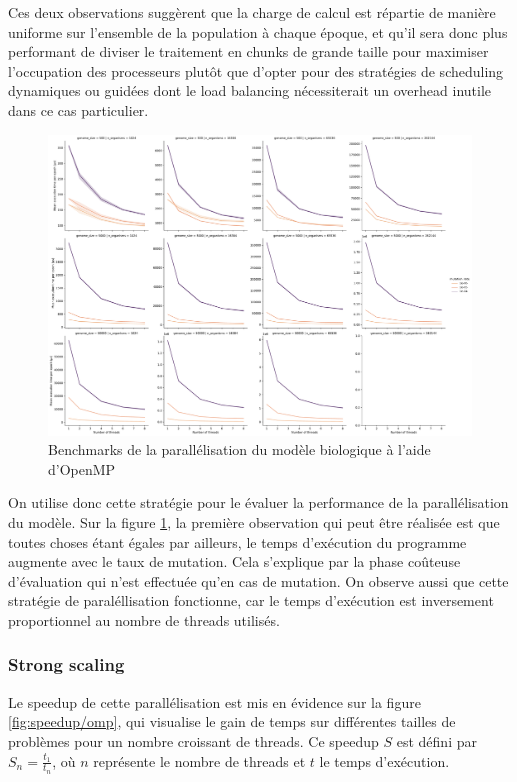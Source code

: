\documentclass[a4paper, 10pt, twoside]{article}
\begin{document}
Ces deux observations suggèrent que la charge de calcul est répartie de manière uniforme sur l'ensemble de la population à chaque époque, et qu'il sera donc plus performant de diviser le traitement en chunks de grande taille pour maximiser l'occupation des processeurs plutôt que d'opter pour des stratégies de scheduling dynamiques ou guidées dont le load balancing nécessiterait un overhead inutile dans ce cas particulier.

\begin{figure}[htb]
	\centering
	\includegraphics[width=0.7\linewidth]{img/benchmark_omp_static.pdf}
	\caption{Benchmarks de la parallélisation du modèle biologique à l'aide d'OpenMP}
	\label{fig:benchmarks/omp}
\end{figure}

On utilise donc cette stratégie pour le évaluer la performance de la parallélisation du modèle.
Sur la figure \ref{fig:benchmarks/omp}, la première observation qui peut être réalisée est que toutes choses étant égales par ailleurs, le temps d'exécution du programme augmente avec le taux de mutation. Cela s'explique par la phase coûteuse d'évaluation qui n'est effectuée qu'en cas de mutation. On observe aussi que cette stratégie de paraléllisation fonctionne, car le temps d'exécution est inversement proportionnel au nombre de threads utilisés.

\subsubsection*{Strong scaling}

Le speedup de cette parallélisation est mis en évidence sur la figure \ref{fig:speedup/omp}, qui visualise le gain de temps sur différentes tailles de problèmes pour un nombre croissant de threads.
Ce speedup $S$ est défini par $ S_n = \frac{t_1}{t_n} $, où $n$ représente le nombre de threads et $t$ le temps d'exécution.
\end{document}
